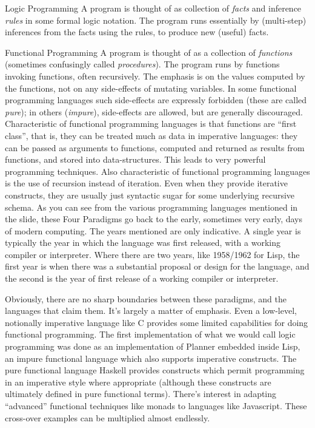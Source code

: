 \begin{frame}
\begin{annotation}
\item[Logic Programming]  A program is thought of as collection
of \emph{facts} and inference \emph{rules} in some formal logic
notation.  The program runs essentially by (multi-step)
inferences from the facts using the rules, to produce new
(useful) facts.

\item[Functional Programming]  A program is thought of as
a collection of \emph{functions} (sometimes confusingly
called \emph{procedures}).  The program runs by functions
invoking functions, often recursively.  The emphasis is on the
values computed by the functions, not on any side-effects of
mutating variables.  In some functional programming languages
such side-effects are expressly forbidden (these are
called \emph{pure}); in others (\emph{impure}), side-effects are
allowed, but are generally discouraged.  Characteristic of
functional programming languages is that functions are ``first
class'', that is, they can be treated much as data in imperative
languages: they can be passed as arguments to functions,
computed and returned as results from functions, and stored into
data-structures.  This leads to very powerful programming
techniques.  Also characteristic of functional programming
languages is the use of recursion instead of iteration.  Even
when they provide iterative constructs, they are usually just
syntactic sugar for some underlying recursive schema.
\ed
As you can see from the various programming languages mentioned
in the slide, these Four Paradigms go back to the early,
sometimes very early, days of modern computing.  The years
mentioned are only indicative.  A single year is typically the
year in which the language was first released, with a working
compiler or interpreter.  Where there are two years, like
1958{\slash}1962 for Lisp, the first year is when there was a
substantial proposal or design for the language, and the second
is the year of first release of a working compiler or
interpreter.

Obviously, there are no sharp boundaries between these
paradigms, and the languages that claim them.  It's largely a
matter of emphasis.  Even a low-level, notionally imperative
language like C provides some limited capabilities for doing
functional programming.  The first implementation of what we
would call logic programming was done as an implementation of
Planner embedded inside Lisp, an impure functional language
which also supports imperative constructs.  The pure functional
language Haskell provides constructs which permit programming in
an imperative style where appropriate (although these constructs
are ultimately defined in pure functional terms).  There's
interest in adapting ``advanced'' functional techniques like
monads to languages like Javascript.  These cross-over examples
can be multiplied almost endlessly.


\end{annotation}
\end{frame}
